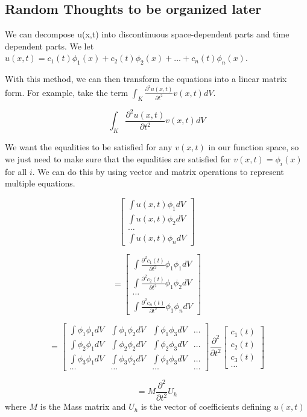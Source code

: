 \subsection{Random Thoughts to be organized later}

We can decompose u(x,t) into discontinuous space-dependent parts and time dependent parts. We let $u(x,t) = c_1(t) \phi_1(x) + c_2(t) \phi_2(x) + \ldots + c_n(t) \phi_n(x)$. 

With this method, we can then transform the equations into a linear matrix form. For example, take the term $\int_K \frac{\partial^2 u(x,t)}{\partial t^2} v(x,t) dV$.

$$\int_K \frac{\partial^2 u(x,t)}{\partial t^2} v(x,t) dV$$

We want the equalities to be satisfied for any $v(x,t)$ in our function space, so we just need to make sure that the equalities are satisfied for $v(x,t) = \phi_i(x)$ for all $i$. We can do this by using vector and matrix operations to represent multiple equations.


$$\begin{bmatrix}
\int u(x,t) \phi_1 dV \\
\int u(x,t) \phi_2 dV \\
\ldots \\
\int u(x,t) \phi_n dV
\end{bmatrix}$$

$$= \begin{bmatrix}
\int \frac{\partial^2 c_1(t)}{\partial t^2} \phi_1 \phi_1 dV \\
\int \frac{\partial^2 c_2(t)}{\partial t^2} \phi_1 \phi_2 dV \\
\ldots \\
\int \frac{\partial^2 c_n(t)}{\partial t^2} \phi_1 \phi_n dV
\end{bmatrix}$$

$$= \begin{bmatrix}
    \int \phi_1 \phi_1 dV & \int \phi_1 \phi_2 dV & \int \phi_1 \phi_3 dV & \ldots \\
    \int \phi_2 \phi_1 dV & \int \phi_2 \phi_2 dV & \int \phi_2 \phi_3 dV & \ldots \\
    \int \phi_3 \phi_1 dV & \int \phi_3 \phi_2 dV & \int \phi_3 \phi_3 dV & \ldots \\
    \ldots & \ldots & \ldots & \ldots 
\end{bmatrix} 
\frac{\partial^2}{\partial t^2} 
\begin{bmatrix}
    c_1(t) \\
    c_2(t) \\
    c_3(t) \\
    \ldots
\end{bmatrix} $$

$$= M \frac{\partial^2}{\partial t^2} U_h$$
where $M$ is the Mass matrix and $U_h$ is the vector of coefficients defining $u(x,t)$


